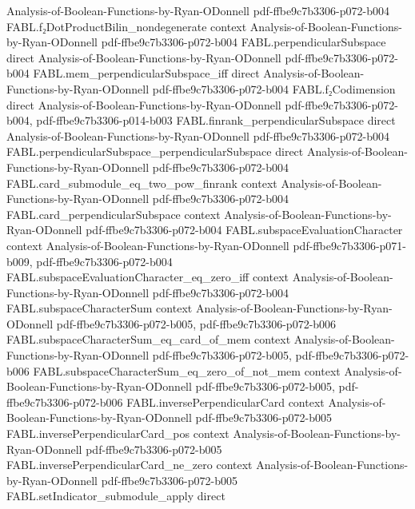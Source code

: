 \begin{theorem}
  {Analysis-of-Boolean-Functions-by-Ryan-ODonnell}
  {pdf-ffbe9c7b3306-p072-b004}
\proofstep
  {FABL.f₂DotProductBilin_nondegenerate}
  {context}
  {Analysis-of-Boolean-Functions-by-Ryan-ODonnell}
  {pdf-ffbe9c7b3306-p072-b004}
\proofstep
  {FABL.perpendicularSubspace}
  {direct}
  {Analysis-of-Boolean-Functions-by-Ryan-ODonnell}
  {pdf-ffbe9c7b3306-p072-b004}
\proofstep
  {FABL.mem_perpendicularSubspace_iff}
  {direct}
  {Analysis-of-Boolean-Functions-by-Ryan-ODonnell}
  {pdf-ffbe9c7b3306-p072-b004}
\proofstep
  {FABL.f₂Codimension}
  {direct}
  {Analysis-of-Boolean-Functions-by-Ryan-ODonnell}
  {pdf-ffbe9c7b3306-p072-b004,
    pdf-ffbe9c7b3306-p014-b003}
\proofstep
  {FABL.finrank_perpendicularSubspace}
  {direct}
  {Analysis-of-Boolean-Functions-by-Ryan-ODonnell}
  {pdf-ffbe9c7b3306-p072-b004}
\proofstep
  {FABL.perpendicularSubspace_perpendicularSubspace}
  {direct}
  {Analysis-of-Boolean-Functions-by-Ryan-ODonnell}
  {pdf-ffbe9c7b3306-p072-b004}
\proofstep
  {FABL.card_submodule_eq_two_pow_finrank}
  {context}
  {Analysis-of-Boolean-Functions-by-Ryan-ODonnell}
  {pdf-ffbe9c7b3306-p072-b004}
\proofstep
  {FABL.card_perpendicularSubspace}
  {context}
  {Analysis-of-Boolean-Functions-by-Ryan-ODonnell}
  {pdf-ffbe9c7b3306-p072-b004}
\proofstep
  {FABL.subspaceEvaluationCharacter}
  {context}
  {Analysis-of-Boolean-Functions-by-Ryan-ODonnell}
  {pdf-ffbe9c7b3306-p071-b009,
    pdf-ffbe9c7b3306-p072-b004}
\proofstep
  {FABL.subspaceEvaluationCharacter_eq_zero_iff}
  {context}
  {Analysis-of-Boolean-Functions-by-Ryan-ODonnell}
  {pdf-ffbe9c7b3306-p072-b004}
\proofstep
  {FABL.subspaceCharacterSum}
  {context}
  {Analysis-of-Boolean-Functions-by-Ryan-ODonnell}
  {pdf-ffbe9c7b3306-p072-b005,
    pdf-ffbe9c7b3306-p072-b006}
\proofstep
  {FABL.subspaceCharacterSum_eq_card_of_mem}
  {context}
  {Analysis-of-Boolean-Functions-by-Ryan-ODonnell}
  {pdf-ffbe9c7b3306-p072-b005,
    pdf-ffbe9c7b3306-p072-b006}
\proofstep
  {FABL.subspaceCharacterSum_eq_zero_of_not_mem}
  {context}
  {Analysis-of-Boolean-Functions-by-Ryan-ODonnell}
  {pdf-ffbe9c7b3306-p072-b005,
    pdf-ffbe9c7b3306-p072-b006}
\proofstep
  {FABL.inversePerpendicularCard}
  {context}
  {Analysis-of-Boolean-Functions-by-Ryan-ODonnell}
  {pdf-ffbe9c7b3306-p072-b005}
\proofstep
  {FABL.inversePerpendicularCard_pos}
  {context}
  {Analysis-of-Boolean-Functions-by-Ryan-ODonnell}
  {pdf-ffbe9c7b3306-p072-b005}
\proofstep
  {FABL.inversePerpendicularCard_ne_zero}
  {context}
  {Analysis-of-Boolean-Functions-by-Ryan-ODonnell}
  {pdf-ffbe9c7b3306-p072-b005}
\proofstep
  {FABL.setIndicator_submodule_apply}
  {direct}

\end{theorem}
